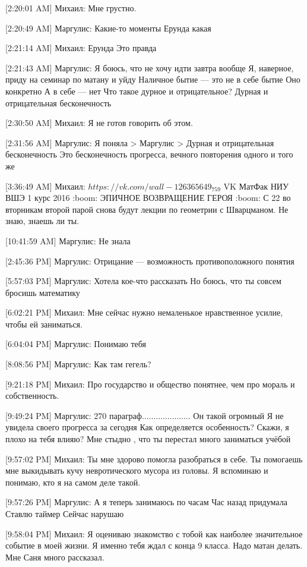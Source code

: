 \documentclass{article}
\begin{document}
{[2:20:01 AM] Михаил:
Мне грустно.

[2:20:49 AM] Маргулис:
Какие-то моменты
 Ерунда какая

[2:21:14 AM] Михаил:
Ерунда
 Это правда

[2:21:43 AM] Маргулис:
Я боюсь, что не хочу идти завтра вообще
 Я, наверное, приду на семинар по матану и уйду
 Наличное бытие — это не в себе бытие
 Оно конкретно
 А в себе — нет
 Что такое дурное и отрицательное?
 Дурная и отрицательная бесконечность

[2:30:50 AM] Михаил:
Я не готов говорить об этом.

[2:31:56 AM] Маргулис:
Я поняла
> Маргулис
> Дурная и отрицательная бесконечность
Это бесконечность прогресса, вечного повторения одного и того же

[3:36:49 AM] Михаил:
$https://vk.com/wall-126365649_759$
VK
МатФак НИУ ВШЭ 1 курс 2016
:boom: ЭПИЧНОЕ ВОЗВРАЩЕНИЕ ГЕРОЯ :boom: С 22 во вторникам второй парой снова будут лекции по геометрии с Шварцманом.
 Не знаю, знаешь ли ты.

[10:41:59 AM] Маргулис:
Не знала

[2:45:36 PM] Маргулис:
Отрицание — возможность противоположного понятия

[5:57:03 PM] Маргулис:
Хотела кое-что рассказать
 Но боюсь, что ты совсем бросишь математику

[6:02:21 PM] Михаил:
Мне сейчас нужно немаленькое нравственное усилие, чтобы ей заниматься.

[6:04:04 PM] Маргулис:
Понимаю тебя

[8:08:56 PM] Маргулис:
Как там гегель?

[9:21:18 PM] Михаил:
Про государство и общество понятнее, чем про мораль и собственность.

[9:49:24 PM] Маргулис:
270 параграф.....................
 Он такой огромный
 Я не увидела своего прогресса за сегодня
 Как определяется особенность?
 Скажи, я плохо на тебя влияю?
 Мне стыдно , что ты перестал много заниматься учёбой

[9:57:02 PM] Михаил:
Ты мне здорово помогла разобраться в себе. Ты помогаешь мне выкидывать кучу невротического мусора из головы. Я вспоминаю и понимаю, кто я на самом деле такой.

[9:57:26 PM] Маргулис:
А я теперь занимаюсь по часам
 Час назад придумала
 Ставлю таймер
 Сейчас нарушаю

[9:58:04 PM] Михаил:
Я оцениваю знакомство с тобой как наиболее значительное событие в моей жизни.
 Я именно тебя ждал с конца 9 класса.
 Надо матан делать. Мне Саня много рассказал.

}
\end{document}

